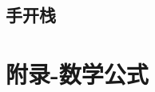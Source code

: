 \documentclass[titlepage,a4paper,10pt]{article}
\begin{document}
\begin{multicols}{2}
\begin{spacing}{0.8}
			\subsection{手开栈}
				
		\section{附录-数学公式}
			
			
		\end{spacing}
		\endgroup
	\end{multicols}
\end{document}
